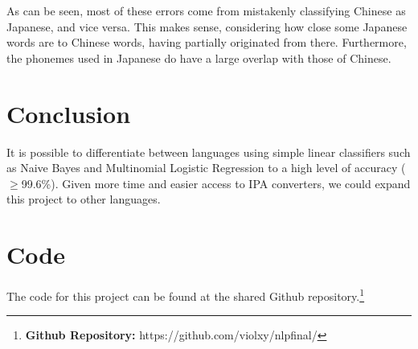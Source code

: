 \documentclass[a4paper]{article}
\begin{document}
As can be seen, most of these errors come from mistakenly classifying Chinese as Japanese, and vice versa. This makes sense, considering how close some Japanese words are to Chinese words, having partially originated from there. Furthermore, the phonemes used in Japanese do have a large overlap with those of Chinese.
\section{Conclusion}
It is possible to differentiate between languages using simple linear classifiers such as Naive Bayes and Multinomial Logistic Regression to a high level of accuracy ($\ge$99.6\%). Given more time and easier access to IPA converters, we could expand this project to other languages.\\
\section{Code}
The code for this project can be found at the shared Github repository.\footnote{\textbf{Github Repository: }https://github.com/violxy/nlpfinal/}
\end{document}
